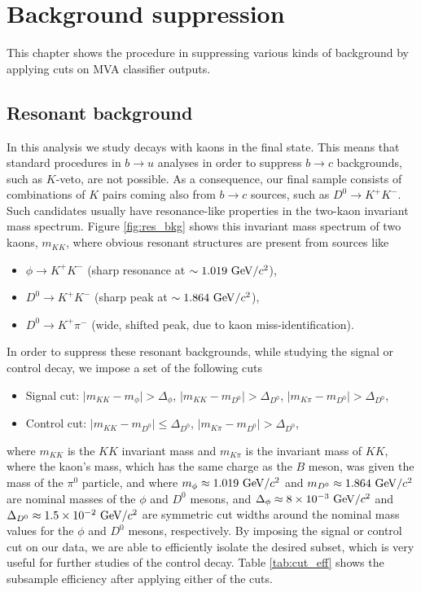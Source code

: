 \chapter{Background suppression}\label{sec:background-suppression}

This chapter shows the procedure in suppressing various kinds of background by applying cuts on MVA classifier outputs. 

\section{Resonant background}

In this analysis we study decays with kaons in the final state. This means that standard procedures in $b \to u$ analyses in order to suppress $b \to c$ backgrounds, such as $K$-veto, are not possible. As a consequence, our final sample consists of combinations of $K$ pairs coming also from $b \to c$  sources, such as $D^0 \to K^+ K^-$. Such candidates usually have resonance-like properties in the two-kaon invariant mass spectrum. Figure \ref{fig:res_bkg} shows this invariant mass spectrum of two kaons, $m_{KK}$, where obvious resonant structures are present from sources like
\begin{itemize}
\item $\phi \to K^+K^-$ (sharp resonance at $\sim1.019\mathrm{~GeV}/c^2$),
\item $D^0 \to K^+K^-$ (sharp peak at $\sim 1.864\mathrm{~GeV}/c^2$),
\item $D^0 \to K^+ \pi^-$ (wide, shifted peak, due to kaon miss-identification).
\end{itemize}

In order to suppress these resonant backgrounds, while studying the signal or control decay, we impose a set of the following cuts
\begin{itemize}
\item Signal cut: $\vert m_{KK} - m_{\phi} \vert > \Delta_\phi$, $\vert m_{KK} - m_{D^0} \vert > \Delta_{D^0}$, $\vert m_{K\pi} - m_{D^0} \vert > \Delta_{D^0}$,
\item Control cut: $\vert m_{KK} - m_{D^0} \vert \leq \Delta_{D^0}$, $\vert m_{K\pi} - m_{D^0} \vert > \Delta_{D^0}$,
\end{itemize}

where $m_{KK}$ is the $KK$ invariant mass and $m_{K\pi}$ is the invariant mass of $KK$, where the kaon's mass, which has the same charge as the $B$ meson, was given the mass of the $\pi^0$ particle, and where $m_\phi \approx 1.019\mathrm{~GeV}/c^2$ and $m_{D^0} \approx 1.864\mathrm{~GeV}/c^2$ are nominal masses of the $\phi$ and $D^0$ mesons, and $\Delta_\phi \approx 8\times 10^{-3}\mathrm{~GeV}/c^2$ and $\Delta_{D^0} \approx 1.5\times 10^{-2}\mathrm{~GeV}/c^2$ are symmetric cut widths around the nominal mass values for the $\phi$ and $D^0$ mesons, respectively. By imposing the signal or control cut on our data, we are able to efficiently isolate the desired subset, which is very useful for further studies of the control decay. Table \ref{tab:cut_eff} shows the subsample efficiency after applying either of the cuts.

